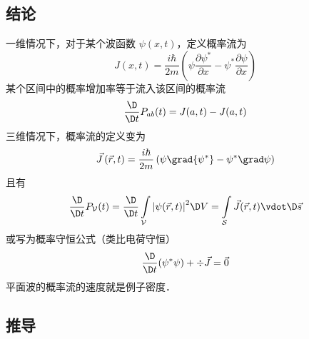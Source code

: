 

\subsection{结论}
一维情况下，对于某个波函数 $\psi \left( {x,t} \right)$，定义概率流为
\begin{equation}
J\left( {x,t} \right) = \frac{{i\hbar }}{{2m}}\left( {\psi \frac{{\partial {\psi ^ * }}}{{\partial x}} - {\psi ^ * }\frac{{\partial \psi }}{{\partial x}}} \right)
\end{equation}
某个区间中的概率增加率等于流入该区间的概率流
\begin{equation}
\frac{\D}{{\D t}}{P_{ab}}(t) = J(a,t) - J(a,t)
\end{equation}
三维情况下，概率流的定义变为
\begin{equation}
\vec J\left( {\vec r,t} \right) = \frac{{i\hbar }}{{2m}}\left( {\psi \grad {\psi ^ * } - {\psi ^ * }\grad \psi } \right)
\end{equation}
且有
\begin{equation}
\frac{\D}{{\D t}}{P_\mathcal{V}}(t) = \frac{\D}{{\D t}}\int\limits_\mathcal{V} {{{\left| {\psi (\vec r,t)} \right|}^2}\D V}  = \int\limits_\mathcal{S} {\vec J(\vec r,t) \vdot \D\vec s}
\end{equation}
或写为概率守恒公式（类比电荷守恒） %
\begin{equation}
\frac{\D}{{\D t}}({\psi ^ * }\psi ) + \div\vec J = \vec 0
\end{equation}
平面波的概率流的速度就是例子密度．

\subsection{推导}

